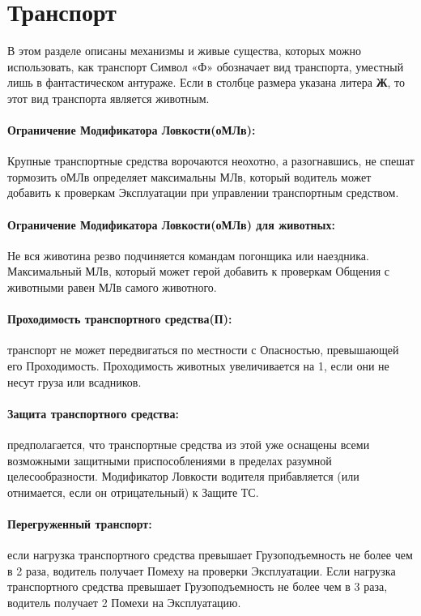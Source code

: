 \section{Транспорт}
В этом разделе описаны механизмы и живые существа, которых можно использовать, как транспорт
\newline Символ «Ф» обозначает вид транспорта, уместный лишь в фантастическом антураже.
\newline Если в столбце размера указана литера \textbf{Ж}, то этот вид транспорта является животным.
\paragraph{Ограничение Модификатора Ловкости(оМЛв):} Крупные транспортные средства ворочаются неохотно, а разогнавшись, не спешат тормозить оМЛв определяет максимальны МЛв, который водитель может добавить к проверкам Эксплуатации при управлении транспортным средством.
\paragraph{Ограничение Модификатора Ловкости(оМЛв) для животных:} Не вся животина резво подчиняется командам погонщика или наездника. Максимальный МЛв, который может герой добавить к проверкам Общения с животными равен МЛв самого животного.
\paragraph{Проходимость транспортного средства(П):} транспорт не может передвигаться по местности с Опасностью, превышающей его Проходимость. Проходимость животных увеличивается на 1, если они не несут груза или всадников.
\paragraph{Защита транспортного средства:} предполагается, что транспортные средства из этой уже оснащены всеми возможными защитными приспособлениями в пределах разумной целесообразности. Модификатор Ловкости водителя прибавляется (или отнимается, если он отрицательный) к Защите ТС.
\paragraph{Перегруженный транспорт:} если нагрузка транспортного средства превышает Грузоподъемность не более чем в 2 раза, водитель получает Помеху на проверки Эксплуатации. Если нагрузка транспортного средства превышает Грузоподъемность не более чем в 3 раза, водитель получает 2 Помехи на Эксплуатацию.
